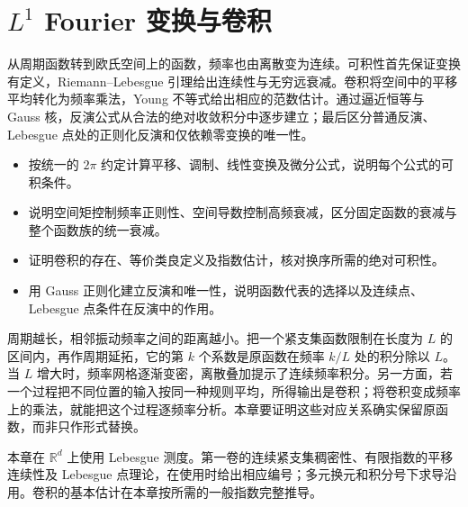 \chapter{\texorpdfstring{\(L^1\)}{L¹} Fourier 变换与卷积}
\label{b2:ch:03}
\begin{chapterabstract}
从周期函数转到欧氏空间上的函数，频率也由离散变为连续。可积性首先保证变换有定义，Riemann--Lebesgue 引理给出连续性与无穷远衰减。卷积将空间中的平移平均转化为频率乘法，Young 不等式给出相应的范数估计。通过逼近恒等与 Gauss 核，反演公式从合法的绝对收敛积分中逐步建立；最后区分普通反演、Lebesgue 点处的正则化反演和仅依赖零变换的唯一性。
\end{chapterabstract}
\begin{learninggoals}
\begin{itemize}
\item\label{b2:item:03-goal-normalization}按统一的 \(2\pi\) 约定计算平移、调制、线性变换及微分公式，说明每个公式的可积条件。
\item\label{b2:item:03-goal-decay}说明空间矩控制频率正则性、空间导数控制高频衰减，区分固定函数的衰减与整个函数族的统一衰减。
\item\label{b2:item:03-goal-convolution}证明卷积的存在、等价类良定义及指数估计，核对换序所需的绝对可积性。
\item\label{b2:item:03-goal-inversion}用 Gauss 正则化建立反演和唯一性，说明函数代表的选择以及连续点、Lebesgue 点条件在反演中的作用。
\end{itemize}
\end{learninggoals}

周期越长，相邻振动频率之间的距离越小。把一个紧支集函数限制在长度为 \(L\) 的区间内，再作周期延拓，它的第 \(k\) 个系数是原函数在频率 \(k/L\) 处的积分除以 \(L\)。当 \(L\) 增大时，频率网格逐渐变密，离散叠加提示了连续频率积分。另一方面，若一个过程把不同位置的输入按同一种规则平均，所得输出是卷积；将卷积变成频率上的乘法，就能把这个过程逐频率分析。本章要证明这些对应关系确实保留原函数，而非只作形式替换。

\ProseParagraphBreak

本章在 \(\mathbb R^d\) 上使用 Lebesgue 测度。第一卷的连续紧支集稠密性、有限指数的平移连续性及 Lebesgue 点理论，在使用时给出相应编号；多元换元和积分号下求导沿用。卷积的基本估计在本章按所需的一般指数完整推导。

\ProseParagraphBreak

